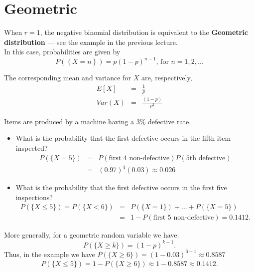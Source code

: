 \documentclass[smaller]{beamer}\usepackage[]{graphicx}\usepackage[]{color}
\renewcommand{\Pr}{P}
\newcommand{\bea}{\begin{eqnarray}}
\newcommand{\eea}{\end{eqnarray}}
\newcommand{\nn}{\nonumber}
\begin{document}
\section{Geometric}


\begin{frame}{\secname}
  \begin{definition}

  When $r=1$, the negative binomial distribution is equivalent to the
  \textbf{Geometric distribution} --- see the example in the previous lecture. \\
  \medskip
  In this case, probabilities are given by%
  \begin{equation*}
  \Pr (\left\{ X=n\right\}) =p\left( 1-p\right) ^{n-1}\text{, for }n=1,2,...
  \end{equation*}
  \end{definition}

  The corresponding mean and variance for $X$ are, respectively,%
  \begin{eqnarray*}
  E\left[ X\right] &=&\frac{ 1 }{p} \\
  Var\left( X\right) &=&\frac{\left( 1-p\right) }{p^{2}}
  \end{eqnarray*}
\end{frame}

\begin{frame}{\secname}
  \begin{small}

  \begin{example}
  \begin{footnotesize}
  Items are produced by a machine having a 3\% defective rate.
  \begin{itemize}
  \item What is the probability that the first defective occurs in the fifth item inspected? \\
  \bea
  P(\{X	=	5\})	&=&	P (\text{first	4	non-defective}) P (\text{5th defective}) \nn \\
  &=& (0.97)^4(0.03) \approx 0.026 \nn
  \eea
  \item What is the probability that the first defective occurs in the first five inspections?
  \bea
  P(\{X	\leq 5	\}) = P(\{X	< 6	\})	&=&	 P (\{X=1\})+ ... + P(\{X=5\}) \nn \\
  &=& 1- P(\text{first 5 non-defective}) = 0.1412.  \nn %
  \eea
  \end{itemize}
  \end{footnotesize}
  \end{example}

  More generally, for a geometric random variable we have:
  $$
  P(\{X \geq k \}) = (1-p)^{k-1}.
  $$
  Thus, in the example we have $P( \{X	\geq 6	\}) = (1-0.03)^{6-1}\approx 0.8587$
  \bea
  P(\{X	\leq 5	\}) = 1-P( \{X	\geq 6	\}) \approx 1- 0.8587 \approx 0.1412. \nn
  \eea
  \end{small}
\end{frame}
\end{document}
